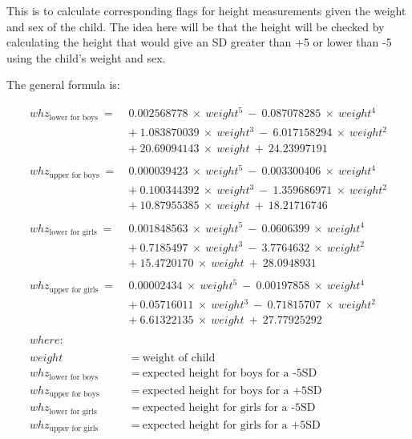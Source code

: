 \documentclass[12pt,a4paper]{article}
\theoremstyle{definition}
\theoremstyle{definition}
\theoremstyle{definition}
\theoremstyle{remark}
\begin{document}
This is to calculate corresponding flags for height measurements given
the weight and sex of the child. The idea here will be that the height
will be checked by calculating the height that would give an SD greater
than +5 or lower than -5 using the child's weight and sex.

The general formula is:

\[\begin{aligned}
whz_\text{lower for boys} ~ = ~ & 0.002568778 ~ \times ~ weight ^ 5 ~ - ~ 0.087078285 ~ \times ~ weight ^ 4 \\
& + ~ 1.083870039 ~ \times ~ weight ^ 3 ~ - ~ 6.017158294 ~ \times ~ weight ^ 2 \\
& + ~ 20.69094143 ~ \times ~ weight ~ + ~ 24.23997191 \\
\\
whz_\text{upper for boys} ~ = ~ &  0.000039423 ~ \times ~ weight ^ 5 ~ - ~ 0.003300406 ~ \times ~ weight ^ 4 \\
& + ~ 0.100344392 ~ \times ~ weight ^ 3 ~ - ~ 1.359686971 ~ \times ~ weight ^ 2 \\
& + ~ 10.87955385 ~ \times ~ weight ~ + ~ 18.21716746 \\
\\
whz_\text{lower for girls} ~ = ~ & 0.001848563 ~ \times ~ weight ^ 5 ~ - ~ 0.0606399 ~ \times ~ weight ^ 4 \\
& + ~ 0.7185497 ~ \times ~ weight ^ 3 ~ - ~ 3.7764632 ~ \times ~ weight ^ 2 \\
& + ~ 15.4720170 ~ \times ~ weight ~ + ~ 28.0948931 \\
\\
whz_\text{upper for girls} ~ = ~ & 0.00002434 ~ \times ~ weight ^ 5 ~ - ~ 0.00197858 ~ \times ~ weight ^ 4 \\
& + ~ 0.05716011 ~ \times ~ weight ^ 3 ~ - ~ 0.71815707 ~ \times ~ weight ^ 2 \\
& + ~ 6.61322135 ~ \times ~ weight ~ + ~ 27.77925292 \\
\\
where: & \\
\\
weight & ~ = ~ \text{weight of child} \\
whz_\text{lower for boys} & ~ = ~ \text{expected height for boys for a -5SD} \\
whz_\text{upper for boys} & ~ = ~ \text{expected height for boys for a +5SD} \\
whz_\text{lower for girls} & ~ = ~ \text{expected height for girls for a -5SD} \\
whz_\text{upper for girls} & ~ = ~ \text{expected height for girls for a +5SD}
\end{aligned}\]
\end{document}
